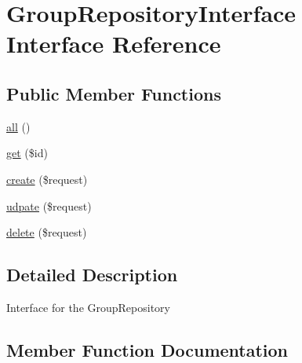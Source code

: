 \hypertarget{interface_app_1_1_repositories_1_1_product_1_1_group_repository_interface}{}\section{Group\+Repository\+Interface Interface Reference}
\label{interface_app_1_1_repositories_1_1_product_1_1_group_repository_interface}
\subsection*{Public Member Functions}
\begin{DoxyCompactItemize}
\item 
\mbox{\hyperlink{interface_app_1_1_repositories_1_1_product_1_1_group_repository_interface_af9d14e4ae6227970ad603987781573ca}{all}} ()
\item 
\mbox{\hyperlink{interface_app_1_1_repositories_1_1_product_1_1_group_repository_interface_a50e3bfb586b2f42932a6a93f3fbb0828}{get}} (\$id)
\item 
\mbox{\hyperlink{interface_app_1_1_repositories_1_1_product_1_1_group_repository_interface_a4fa811c83f27da01b0d92bdb2a711a13}{create}} (\$request)
\item 
\mbox{\hyperlink{interface_app_1_1_repositories_1_1_product_1_1_group_repository_interface_a2aedea52c52e54ba3c4c9f60423e7ef1}{udpate}} (\$request)
\item 
\mbox{\hyperlink{interface_app_1_1_repositories_1_1_product_1_1_group_repository_interface_a126a3799c44d72393ca4732081306dfd}{delete}} (\$request)
\end{DoxyCompactItemize}


\subsection{Detailed Description}
Interface for the Group\+Repository 

\subsection{Member Function Documentation}
\mbox{\label{interface_app_1_1_repositories_1_1_product_1_1_group_repository_interface_af9d14e4ae6227970ad603987781573ca}} 
